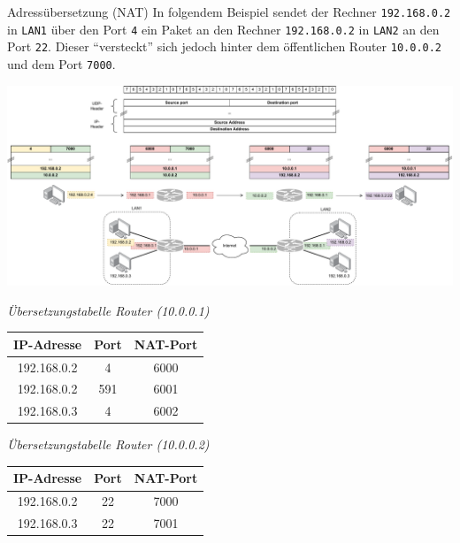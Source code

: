 \begin{example}{Adressübersetzung (NAT)}
    In folgendem Beispiel sendet der Rechner \texttt{192.168.0.2} in \texttt{LAN1} über den Port \texttt{4} ein Paket an den Rechner \texttt{192.168.0.2} in \texttt{LAN2} an den Port \texttt{22}.
    Dieser \enquote{versteckt} sich jedoch hinter dem öffentlichen Router \texttt{10.0.0.2} und dem Port \texttt{7000}.

    \includegraphics[width=\textwidth]{includes/figures/example_nat.pdf}

    \begin{minipage}[t]{0.5\textwidth}
        \begin{center}
            \emph{Übersetzungstabelle Router (10.0.0.1)}

            \begin{tabular}{|c|c||c|}
                \hline
                IP-Adresse  & Port & NAT-Port \\\hline\hline
                192.168.0.2 & 4    & 6000     \\\hline
                192.168.0.2 & 591  & 6001     \\\hline
                192.168.0.3 & 4    & 6002     \\\hline
            \end{tabular}
        \end{center}
    \end{minipage}
    \begin{minipage}[t]{0.5\textwidth}
        \begin{center}
            \emph{Übersetzungstabelle Router (10.0.0.2)}

            \begin{tabular}{|c|c||c|}
                \hline
                IP-Adresse  & Port & NAT-Port \\\hline\hline
                192.168.0.2 & 22   & 7000     \\\hline
                192.168.0.3 & 22   & 7001     \\\hline
            \end{tabular}
        \end{center}
    \end{minipage}
\end{example}

